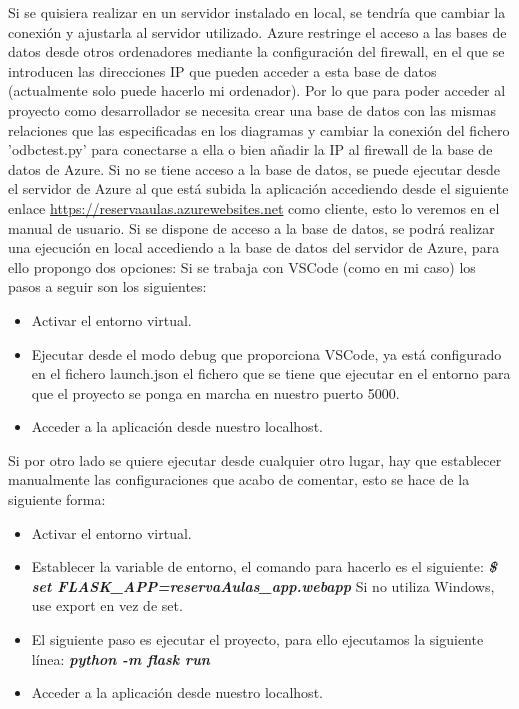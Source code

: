 \newline Si se quisiera realizar en un servidor instalado en local, se tendría que cambiar la conexión y ajustarla al servidor utilizado. Azure restringe el acceso a las bases de datos desde otros ordenadores mediante la configuración del firewall, en el que se introducen las direcciones IP que pueden acceder a esta base de datos (actualmente solo puede hacerlo mi ordenador).\newline
{}
\newline
Por lo que para poder acceder al proyecto como desarrollador se necesita crear una base de datos con las mismas relaciones que las especificadas en los diagramas y cambiar la conexión del fichero 'odbctest.py' para conectarse a ella o bien añadir la IP al firewall de la base de datos de Azure.\newline
Si no se tiene acceso a la base de datos, se puede ejecutar desde el servidor de Azure al que está subida la aplicación accediendo desde el siguiente enlace \url{https://reservaaulas.azurewebsites.net} como cliente, esto lo veremos en el manual de usuario.\newline
Si se dispone de acceso a la base de datos, se podrá realizar una ejecución en local accediendo a la base de datos del servidor de Azure, para ello propongo dos opciones:\newline
Si se trabaja con VSCode (como en mi caso) los pasos a seguir son los siguientes:
\begin{itemize}
    \item Activar el entorno virtual.
    \item Ejecutar desde el modo debug que proporciona VSCode, ya está configurado en el fichero launch.json el fichero que se tiene que ejecutar en el entorno para que el proyecto se ponga en marcha en nuestro puerto 5000.
    \item Acceder a la aplicación desde nuestro localhost.
\end{itemize}
Si por otro lado se quiere ejecutar desde cualquier otro lugar, hay que establecer manualmente las configuraciones que acabo de comentar, esto se hace de la siguiente forma:
\begin{itemize}
    \item Activar el entorno virtual.
    \item Establecer la variable de entorno, el comando para hacerlo es el siguiente:\newline
    \textbf{\textit{\$ set FLASK\_APP=reservaAulas\_app.webapp}}\newline
    Si no utiliza Windows, use export en vez de set.
    \item El siguiente paso es ejecutar el proyecto, para ello ejecutamos la siguiente línea:\newline
    \textbf{\textit{python -m flask run}}
    \item Acceder a la aplicación desde nuestro localhost.
\end{itemize}
